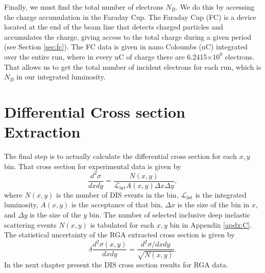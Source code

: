 Finally, we must find the total number of electrons $N_B$. We do this by accessing the charge accumulation in the Faraday Cup. The Faraday Cup (FC) is a device located at the end of the beam line that detects charged particles and accumulates the charge, giving access to the total charge during a given period (see Section \ref{sec:fc}). The FC data is given in nano Coloumbs (nC) integrated over the entire run, where in every nC of charge there are 6.2415$\times 10^{9}$ electrons. That allows us to get the total number of incident electrons for each run, which is $N_B$ in our integrated luminosity.

\newpage
\section{Differential Cross section Extraction}
The final step is to actually calculate the differential cross section for each $x,y$ bin. That cross section for experimental data is given by
\begin{equation}
\frac{d^2\sigma}{dxdy} = \frac{N(x,y)}{\mathscr{L}_{\mathrm{int}}A(x,y)\Delta x \Delta y},
\end{equation}
where $N(x,y)$ is the number of DIS events in the bin, $\mathscr{L}_{\mathrm{int}}$ is the integrated luminosity, $A(x,y)$ is the acceptance of that bin, $\Delta x$ is the size of the bin in $x$, and $\Delta y$ is the size of the $y$ bin. The number of selected inclusive deep inelastic scattering events $N(x,y)$ is tabulated for each $x,y$ bin in Appendix \ref{apdx:C}. The statistical uncertainty of the RGA extracted cross section is given by
\begin{equation}
\delta \frac{d^2\sigma(x,y)}{dxdy} = \frac{d^2\sigma/dxdy}{\sqrt{N(x,y)}}.
\end{equation}
In the next chapter present the DIS cross section results for RGA data.




